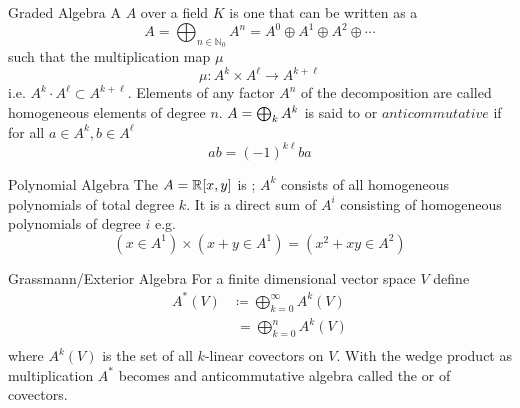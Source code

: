 \begin{definition}{Graded Algebra}{}
    A  \(A\) over a field \(K\) is one that can be written as a 
    \[
        A=\bigoplus _{n\in \mathbb {N} _{0}}A^{n}=A^{0}\oplus A^{1}\oplus A^{2}\oplus \cdots
    \]
    such that the multiplication map \(\mu\)
    \[
        \mu \colon A^k \times A^\ell \rightarrow A^{k + \ell}
    \]
    i.e. \(A^k\cdot A^\ell \subset A^{k+\ell}\). Elements of any factor \(A^n\) of the decomposition are called homogeneous elements of degree \(n\).
    \(A = \bigoplus_k A^k\) is said to  or \(anticommutative\) if for all \(a\in A^k, b\in A^\ell\)
    \[
        ab = (-1)^{k\ell} ba
    \]

\end{definition}

\begin{example}{Polynomial Algebra}{}
    The 
    \(A=\mathbb{R}[x,y]\) is ; \(A^k\) consists of all homogeneous polynomials of total degree \(k\). It is a direct sum of \(A^{i}\) consisting of homogeneous polynomials of degree \(i\) e.g.
    \[
        \left( x \in A^1 \right)
        \times
        \left( x+y \in A^1  \right) =
        \left( x^2+xy \in A^2 \right)
    \]
\end{example}

\begin{definition}{Grassmann/Exterior Algebra}{}
    For a finite dimensional vector space \(V\) define
    \begin{equation}
        \begin{split}
            A^*(V) &\coloneqq \bigoplus_{k=0}^\infty A^k(V)  \\
            &\;= \bigoplus_{k=0}^n A^k(V) \\
        \end{split}
    \end{equation}
    where \(A^k(V)\) is the set of all \(k\)-linear covectors on \(V\).
    With the wedge product as multiplication \(A^*\) becomes and anticommutative algebra called the  or  of covectors.
\end{definition}
